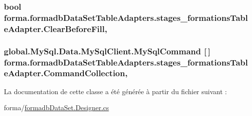 \subsubsection[{\texorpdfstring{Clear\+Before\+Fill}{ClearBeforeFill}}]{\setlength{\rightskip}{0pt plus 5cm}bool forma.\+formadb\+Data\+Set\+Table\+Adapters.\+stages\+\_\+formations\+Table\+Adapter.\+Clear\+Before\+Fill\hspace{0.3cm}{\ttfamily [get]}, {\ttfamily [set]}}\hypertarget{classforma_1_1formadb_data_set_table_adapters_1_1stages__formations_table_adapter_acfdcfc05b6eb1b9aa9c3f935044ccfaa}{}\label{classforma_1_1formadb_data_set_table_adapters_1_1stages__formations_table_adapter_acfdcfc05b6eb1b9aa9c3f935044ccfaa}
\subsubsection[{\texorpdfstring{Command\+Collection}{CommandCollection}}]{\setlength{\rightskip}{0pt plus 5cm}global.\+My\+Sql.\+Data.\+My\+Sql\+Client.\+My\+Sql\+Command \mbox{[}$\,$\mbox{]} forma.\+formadb\+Data\+Set\+Table\+Adapters.\+stages\+\_\+formations\+Table\+Adapter.\+Command\+Collection\hspace{0.3cm}{\ttfamily [get]}, {\ttfamily [protected]}}\hypertarget{classforma_1_1formadb_data_set_table_adapters_1_1stages__formations_table_adapter_a5b51621a90bb9cf0e20159c1722af1b5}{}\label{classforma_1_1formadb_data_set_table_adapters_1_1stages__formations_table_adapter_a5b51621a90bb9cf0e20159c1722af1b5}


La documentation de cette classe a été générée à partir du fichier suivant \+:\begin{DoxyCompactItemize}
\item 
forma/\hyperlink{formadb_data_set_8_designer_8cs}{formadb\+Data\+Set.\+Designer.\+cs}\end{DoxyCompactItemize}
